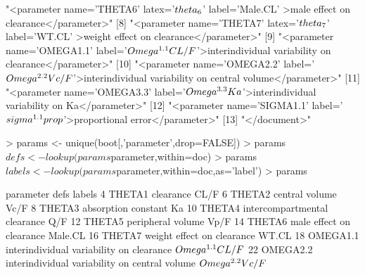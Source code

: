 \begin{Schunk}
\begin{Soutput}
 [7] "<parameter name='THETA6' latex='$\\theta_6$'                 label='Male.CL'                                >male effect on clearance</parameter>"          
 [8] "<parameter name='THETA7' latex='$\\theta_7$'                 label='WT.CL'                                  >weight effect on clearance</parameter>"        
 [9] "<parameter name='OMEGA1.1' label='$\\Omega^{1.1}CL/F$'>interindividual variability on clearance</parameter>"                                                
[10] "<parameter name='OMEGA2.2' label='$\\Omega^{2.2}Vc/F$'>interindividual variability on central volume</parameter>"                                           
[11] "<parameter name='OMEGA3.3' label='$\\Omega^{3.3}Ka$'>interindividual variability on Ka</parameter>"                                                         
[12] "<parameter name='SIGMA1.1' label='$\\sigma^{1.1}prop$'>proportional error</parameter>"                                                                      
[13] "</document>"                                                                                                                                                
\end{Soutput}
\begin{Sinput}
> params <- unique(boot[,'parameter',drop=FALSE])
> params$defs <- lookup(params$parameter,within=doc)
> params$labels <- lookup(params$parameter,within=doc,as='label')
> params
\end{Sinput}
\begin{Soutput}
   parameter                                          defs              labels
4     THETA1                                     clearance                CL/F
6     THETA2                                central volume                Vc/F
8     THETA3                           absorption constant                  Ka
10    THETA4                  intercompartmental clearance                 Q/F
12    THETA5                             peripheral volume                Vp/F
14    THETA6                      male effect on clearance             Male.CL
16    THETA7                    weight effect on clearance               WT.CL
18  OMEGA1.1      interindividual variability on clearance $\\Omega^{1.1}CL/F$
22  OMEGA2.2 interindividual variability on central volume $\\Omega^{2.2}Vc/F$

\end{Soutput}
\end{Schunk}
